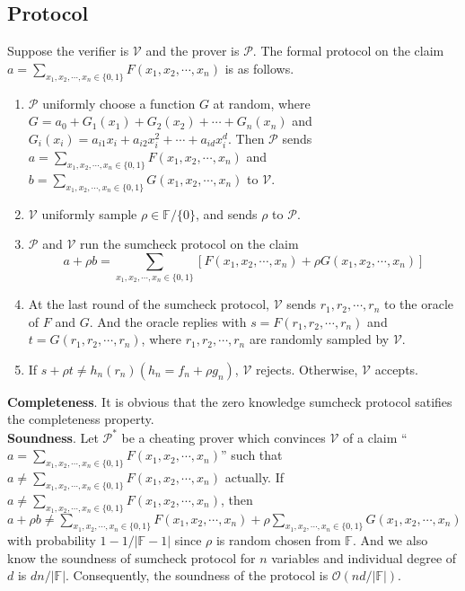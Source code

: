 \subsection{Protocol}
Suppose the verifier is $\mathcal{V}$ and the prover is $\mathcal{P}$. The formal protocol on the claim $a = \sum\limits_{x_1, x_2, \cdots, x_n \in \{0, 1\}} F(x_1, x_2, \cdots, x_n)$ is as follows.\\
\begin{enumerate}

\item $\mathcal{P}$ uniformly choose a function $G$ at random, where $G = a_{0} + G_1(x_1) + G_2(x_2) + \cdots + G_n(x_n)$ and $G_{i}(x_i) = a_{i1}x_i + a_{i2}x_i^2 + \cdots + a_{id}x_i^d$. Then $\mathcal{P}$ sends $a = \sum\limits_{x_1, x_2, \cdots, x_n \in \{0, 1\}} F(x_1, x_2, \cdots, x_n)$ and $b = \sum\limits_{x_1, x_2, \cdots, x_n \in \{0, 1\}} G(x_1, x_2, \cdots, x_n)$ to $\mathcal{V}$.
\item $\mathcal{V}$ uniformly sample $\rho \in \mathbb{F}/\{0\}$, and sends $\rho$ to $\mathcal{P}$.
\item $\mathcal{P}$ and $\mathcal{V}$ run the sumcheck protocol on the claim
$$a + \rho b = \sum\limits_{x_1, x_2, \cdots, x_n \in \{0, 1\}}[F(x_1, x_2, \cdots, x_n) + \rho G(x_1, x_2, \cdots, x_n)]$$
\item At the last round of the sumcheck protocol, $\mathcal{V}$ sends $r_1, r_2, \cdots, r_n$ to the oracle of $F$ and $G$. And the oracle replies with $s = F(r_1, r_2, \cdots, r_n)$ and $t = G(r_1, r_2, \cdots, r_n)$, where $r_1, r_2, \cdots, r_n$ are randomly sampled by $\mathcal{V}$. 
\item If $s + \rho t \neq h_n(r_n)(h_n = f_n + \rho g_n)$, $\mathcal{V}$ rejects. Otherwise, $\mathcal{V}$ accepts.  

\end{enumerate}
\noindent
\textbf{Completeness}. It is obvious that the zero knowledge sumcheck protocol satifies the completeness property.\\

\noindent
\textbf{Soundness}. Let $\mathcal{P}^*$ be a cheating prover which convinces $\mathcal{V}$ of a claim ``$a = \sum\limits_{x_1, x_2, \cdots, x_n \in \{0, 1\}}F(x_1, x_2, \cdots, x_n)$'' such that $a \neq \sum\limits_{x_1, x_2, \cdots, x_n \in \{0, 1\}}F(x_1, x_2, \cdots, x_n)$ actually. If $a \neq \sum\limits_{x_1, x_2, \cdots, x_n \in \{0, 1\}}F(x_1, x_2, \cdots, x_n)$, then $a + \rho b \neq \sum\limits_{x_1, x_2, \cdots, x_n \in \{0, 1\}}F(x_1, x_2, \cdots, x_n) + \rho \sum\limits_{x_1, x_2, \cdots, x_n \in \{0, 1\}}G(x_1, x_2, \cdots, x_n)$ with probability $1 - 1 / |\mathbb{F} - 1|$ since $\rho$ is random chosen from $\mathbb{F}$. And we also know the soundness of sumcheck protocol for $n$ variables and individual degree of $d$ is $d n /|\mathbb{F}|$. Consequently, the soundness of the protocol is $\mathcal{O}(nd/|\mathbb{F}|)$.\\

